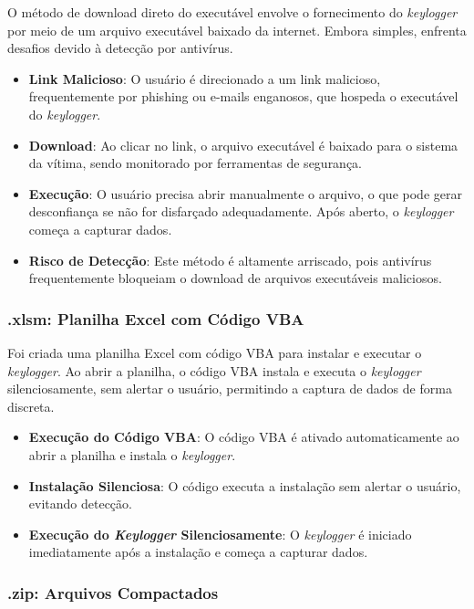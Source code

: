 \documentclass[12pt]{article}
\begin{document}
O método de download direto do executável envolve o fornecimento do \textit{keylogger} por meio de um arquivo executável baixado da internet. Embora simples, enfrenta desafios devido à detecção por antivírus.

\begin{itemize}
    \item \textbf{Link Malicioso}: O usuário é direcionado a um link malicioso, frequentemente por phishing ou e-mails enganosos, que hospeda o executável do \textit{keylogger}.
    \item \textbf{Download}: Ao clicar no link, o arquivo executável é baixado para o sistema da vítima, sendo monitorado por ferramentas de segurança.
    \item \textbf{Execução}: O usuário precisa abrir manualmente o arquivo, o que pode gerar desconfiança se não for disfarçado adequadamente. Após aberto, o \textit{keylogger} começa a capturar dados.
    \item \textbf{Risco de Detecção}: Este método é altamente arriscado, pois antivírus frequentemente bloqueiam o download de arquivos executáveis maliciosos.
\end{itemize}

\subsubsection{.xlsm: Planilha Excel com Código VBA}

Foi criada uma planilha Excel com código VBA para instalar e executar o \textit{keylogger}. Ao abrir a planilha, o código VBA instala e executa o \textit{keylogger} silenciosamente, sem alertar o usuário, permitindo a captura de dados de forma discreta.

\begin{itemize}
    \item \textbf{Execução do Código VBA}: O código VBA é ativado automaticamente ao abrir a planilha e instala o \textit{keylogger}.
    \item \textbf{Instalação Silenciosa}: O código executa a instalação sem alertar o usuário, evitando detecção.
    \item \textbf{Execução do \textit{Keylogger} Silenciosamente}: O \textit{keylogger} é iniciado imediatamente após a instalação e começa a capturar dados.
\end{itemize}

\subsubsection{.zip: Arquivos Compactados}
\end{document}
